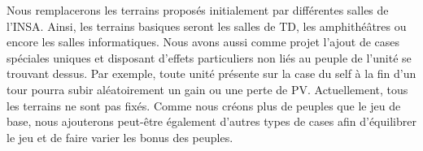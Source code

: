 Nous remplacerons les terrains proposés initialement par différentes salles de l'INSA. Ainsi, les terrains basiques seront les salles de TD, les amphithéâtres ou encore les salles informatiques. Nous avons aussi comme projet l'ajout de cases spéciales uniques et disposant d'effets particuliers non liés au peuple de l'unité se trouvant dessus. Par exemple, toute unité présente sur la case du self à la fin d'un tour pourra subir aléatoirement un gain ou une perte de PV.
Actuellement, tous les terrains ne sont pas fixés. Comme nous créons plus de peuples que le jeu de base, nous ajouterons peut-être également d'autres types de cases afin d'équilibrer le jeu et de faire varier les bonus des peuples.